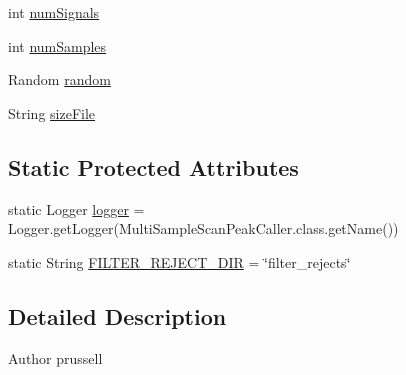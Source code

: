 \begin{DoxyCompactItemize}
\item 
int \hyperlink{classbroad_1_1pda_1_1seq_1_1protection_1_1_multi_sample_scan_peak_caller_a961365a8d7b21a6a2b58cf98fb8435c7}{num\+Signals}
\item 
int \hyperlink{classbroad_1_1pda_1_1seq_1_1protection_1_1_multi_sample_scan_peak_caller_a4f49d8b3b569639a020ed033cee3ece1}{num\+Samples}
\item 
Random \hyperlink{classbroad_1_1pda_1_1seq_1_1protection_1_1_multi_sample_scan_peak_caller_a6e05b47e67a8aa7ae22eff3527b02245}{random}
\item 
String \hyperlink{classbroad_1_1pda_1_1seq_1_1protection_1_1_multi_sample_scan_peak_caller_a83f7fca4b0f3dbcf664e8a65d484c6e1}{size\+File}
\end{DoxyCompactItemize}
\subsection*{Static Protected Attributes}
\begin{DoxyCompactItemize}
\item 
static Logger \hyperlink{classbroad_1_1pda_1_1seq_1_1protection_1_1_multi_sample_scan_peak_caller_a259772e14ac39b3fc10dbfa2c8f94dd2}{logger} = Logger.\+get\+Logger(Multi\+Sample\+Scan\+Peak\+Caller.\+class.\+get\+Name())
\item 
static String \hyperlink{classbroad_1_1pda_1_1seq_1_1protection_1_1_multi_sample_scan_peak_caller_ad231c26f257829c5e658073173aae32f}{F\+I\+L\+T\+E\+R\+\_\+\+R\+E\+J\+E\+C\+T\+\_\+\+D\+I\+R} = \char`\"{}filter\+\_\+rejects\char`\"{}
\end{DoxyCompactItemize}


\subsection{Detailed Description}
\begin{DoxyAuthor}{Author}
prussell 
\end{DoxyAuthor}


